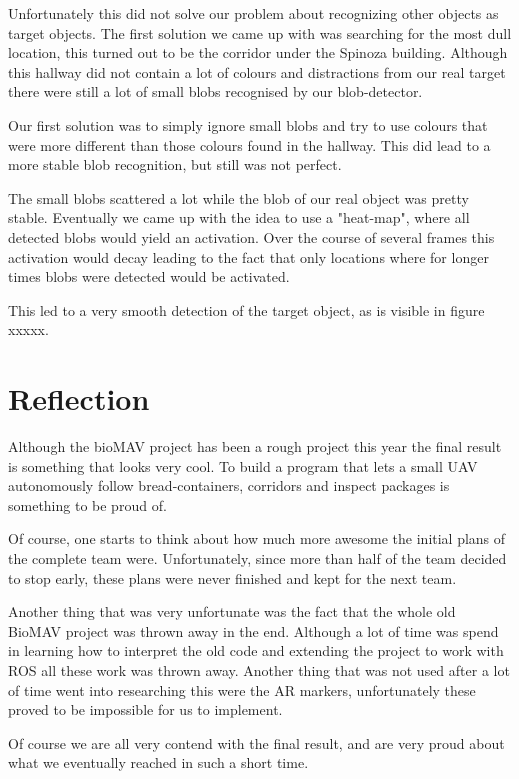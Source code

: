 \documentclass[a4paper,10pt]{article}
\begin{document}
Unfortunately this did not solve our problem about recognizing other objects as target objects. 
The first solution we came up with was searching for the most dull location, this turned out to be the corridor under the Spinoza building. 
Although this hallway did not contain a lot of colours and distractions from our real target there were still a lot of small blobs recognised by our blob-detector. 

Our first solution was to simply ignore small blobs and try to use colours that were more different than those colours found in the hallway. 
This did lead to a more stable blob recognition, but still was not perfect. 

The small blobs scattered a lot while the blob of our real object was pretty stable. 
Eventually we came up with the idea to use a "heat-map", where all detected blobs would yield an activation. 
Over the course of several frames this activation would decay leading to the fact that only locations where for longer times blobs were detected would be activated. 

This led to a very smooth detection of the target object, as is visible in figure xxxxx. 

\section{Reflection}

Although the bioMAV project has been a rough project this year the final result is something that looks very cool. 
To build a program that lets a small UAV autonomously follow bread-containers, corridors and inspect packages is something to be proud of. 

Of course, one starts to think about how much more awesome the initial plans of the complete team were. 
Unfortunately, since more than half of the team decided to stop early, these plans were never finished and kept for the next team. 

Another thing that was very unfortunate was the fact that the whole old BioMAV project was thrown away in the end. 
Although a lot of time was spend in learning how to interpret the old code and extending the project to work with ROS all these work was thrown away. 
Another thing that was not used after a lot of time went into researching this were the AR markers, unfortunately these proved to be impossible for us to implement. 

Of course we are all very contend with the final result, and are very proud about what we eventually reached in such a short time. 




\end{document}
